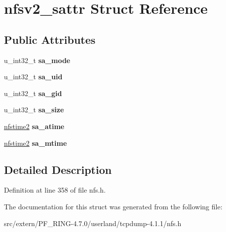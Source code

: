\hypertarget{structnfsv2__sattr}{
\section{nfsv2\_\-sattr Struct Reference}
\label{structnfsv2__sattr}
}
\subsection*{Public Attributes}
\begin{DoxyCompactItemize}
\item 
\hypertarget{structnfsv2__sattr_a80daf148495c242b4ea98a585347dd43}{
u\_\-int32\_\-t {\bfseries sa\_\-mode}}
\label{structnfsv2__sattr_a80daf148495c242b4ea98a585347dd43}

\item 
\hypertarget{structnfsv2__sattr_a34ac473de22b8c487b6238fde8d0e9f0}{
u\_\-int32\_\-t {\bfseries sa\_\-uid}}
\label{structnfsv2__sattr_a34ac473de22b8c487b6238fde8d0e9f0}

\item 
\hypertarget{structnfsv2__sattr_aef17319467cc842937e758b4d802160b}{
u\_\-int32\_\-t {\bfseries sa\_\-gid}}
\label{structnfsv2__sattr_aef17319467cc842937e758b4d802160b}

\item 
\hypertarget{structnfsv2__sattr_ad96cda96c1a875e23ed071707f16088b}{
u\_\-int32\_\-t {\bfseries sa\_\-size}}
\label{structnfsv2__sattr_ad96cda96c1a875e23ed071707f16088b}

\item 
\hypertarget{structnfsv2__sattr_a3ba943e7a9f72f746ddafeaad1de3481}{
\hyperlink{structnfsv2__time}{nfstime2} {\bfseries sa\_\-atime}}
\label{structnfsv2__sattr_a3ba943e7a9f72f746ddafeaad1de3481}

\item 
\hypertarget{structnfsv2__sattr_ad59d1476606413302bc1ff9ffbf75016}{
\hyperlink{structnfsv2__time}{nfstime2} {\bfseries sa\_\-mtime}}
\label{structnfsv2__sattr_ad59d1476606413302bc1ff9ffbf75016}

\end{DoxyCompactItemize}


\subsection{Detailed Description}


Definition at line 358 of file nfs.h.



The documentation for this struct was generated from the following file:\begin{DoxyCompactItemize}
\item 
src/extern/PF\_\-RING-\/4.7.0/userland/tcpdump-\/4.1.1/nfs.h\end{DoxyCompactItemize}
